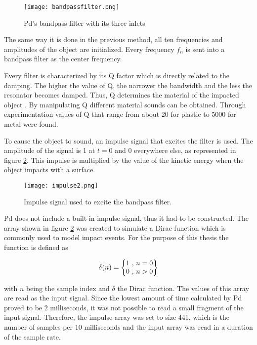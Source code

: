 \begin{figure}[H]
  \centering
    \texttt{[image: bandpassfilter.png]}
      \caption{Pd's bandpass filter with its three inlets}
      \label{fig:pdbandpass}
\end{figure} 

The same way it is done in the previous method, all ten frequencies and amplitudes of the object are initialized. Every frequency $f_n$ is sent into a bandpass filter as the center frequency. 

Every filter is characterized by its \gls{Q} factor which is directly related to the damping. The higher the value of \gls{Q}, the narrower the bandwidth and the less the resonator becomes damped. Thus, \gls{Q} determines the material of the impacted object \cite{gaver1993we}. By manipulating \gls{Q} different material sounds can be obtained. Through experimentation values of \gls{Q} that range from about 20 for plastic to 5000 for metal were found. 

To cause the object to sound, an impulse signal that excites the filter is used. The amplitude of the signal is 1 at $t=0$ and 0 everywhere else, as represented in figure \ref{fig:impulse}. This impulse is multiplied by the value of the kinetic energy when the object impacts with a surface. 

\begin{figure}[H]
  \centering
    \texttt{[image: impulse2.png]}
      \caption{Impulse signal used to excite the bandpass filter.}
      \label{fig:impulse}
\end{figure} 

\gls{Pd} does not include a built-in impulse signal, thus it had to be constructed. The array shown in figure \ref{fig:impulse} was created to simulate a Dirac function which is commonly used to model impact events. For the purpose of this thesis the function is defined as

\begin{equation}\label{eq:dirac}
\delta (n) =  \begin{Bmatrix}
1$ , $n = 0
\\ 
0$ , $n > 0
\end{Bmatrix}
\end{equation}


with $n$ being the sample index and $\delta$ the Dirac function. The values of this array are read as the input signal. Since the lowest amount of time calculated by \gls{Pd} proved to be 2 milliseconds, it was not possible to read a small fragment of the input signal. Therefore, the impulse array was set to size 441, which is the number of samples per 10 milliseconds and the input array was read in a duration of the sample rate.

